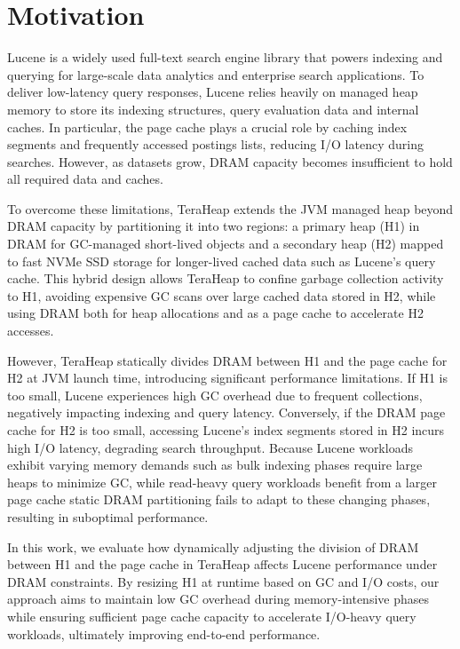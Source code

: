 \section{Motivation}
Lucene is a widely used full-text search engine library that powers indexing and querying for 
large-scale data analytics and enterprise search applications. To deliver low-latency query responses, 
Lucene relies heavily on managed heap memory to store its indexing structures, query evaluation data 
and internal caches. In particular, the page cache plays a crucial role by caching index segments and 
frequently accessed postings lists, reducing I/O latency during searches. However, as datasets grow, DRAM 
capacity becomes insufficient to hold all required data and caches.

To overcome these limitations, TeraHeap extends the JVM managed heap beyond DRAM capacity by partitioning 
it into two regions: a primary heap (H1) in DRAM for GC-managed short-lived objects and a secondary heap 
(H2) mapped to fast NVMe SSD storage for longer-lived cached data such as Lucene’s query cache. This hybrid 
design allows TeraHeap to confine garbage collection activity to H1, avoiding expensive GC scans over large
cached data stored in H2, while using DRAM both for heap allocations and as a page cache to accelerate H2 accesses.

However, TeraHeap statically divides DRAM between H1 and the page cache for H2 at JVM launch time, introducing 
significant performance limitations. If H1 is too small, Lucene experiences high GC overhead due to frequent collections, 
negatively impacting indexing and query latency. Conversely, if the DRAM page cache for H2 is too small, accessing Lucene’s 
index segments stored in H2 incurs high I/O latency, degrading search throughput. Because Lucene workloads exhibit varying 
memory demands such as bulk indexing phases require large heaps to minimize GC, while read-heavy query workloads benefit 
from a larger page cache static DRAM partitioning fails to adapt to these changing phases, resulting in suboptimal performance.

In this work, we evaluate how dynamically adjusting the division of DRAM between H1 and the page cache in TeraHeap affects Lucene 
performance under DRAM constraints. By resizing H1 at runtime based on GC and I/O costs, our approach aims to maintain low GC overhead
during memory-intensive phases while ensuring sufficient page cache capacity to accelerate I/O-heavy query workloads, ultimately improving
end-to-end performance.

